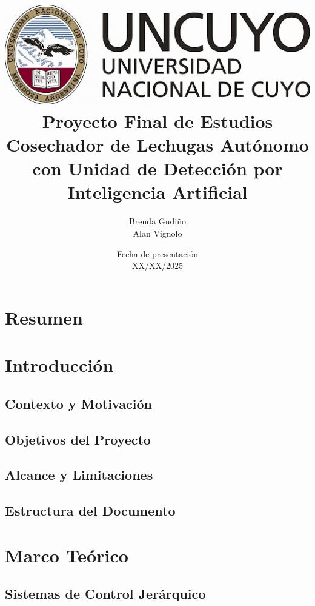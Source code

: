 \documentclass[a4paper,12pt]{report}
\title{
\includegraphics[scale = 0.3]{logo_uncuyo.png} \\ [2cm]
{\Huge \textbf{Proyecto Final de Estudios} \\ [1cm] 
Cosechador de Lechugas Autónomo con Unidad de Detección por Inteligencia Artificial}}
\author{Brenda Gudiño \\ Alan Vignolo}
\date{Fecha de presentación \\ XX/XX/2025}
\begin{document}
\maketitle
\tableofcontents

\chapter*{Resumen}


\chapter{Introducción}

\section{Contexto y Motivación}


\section{Objetivos del Proyecto}


\section{Alcance y Limitaciones}


\section{Estructura del Documento}


\chapter{Marco Teórico}

\section{Sistemas de Control Jerárquico}




\end{document}
